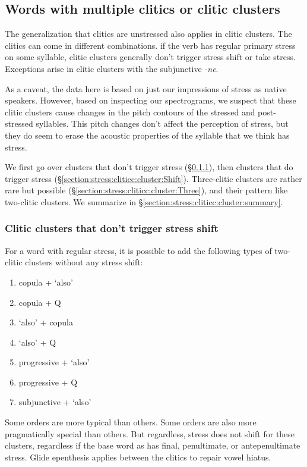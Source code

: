 \subsection{Words with multiple clitics or clitic clusters}\label{section:stress:cliticc:cluster}
The generalization that clitics are unstressed also applies in clitic clusters. The clitics can come in different combinations. if the verb has regular primary stress on some syllable, clitic clusters generally don't trigger stress shift or take stress. Exceptions arise in clitic clusters with the subjunctive \textit{-ne}.     


As a caveat, the data here is based on just our impressions of stress as native speakers. However, based on inspecting our spectrograms, we  suspect that these clitic clusters cause changes in the pitch contours of the stressed and post-stressed syllables. This pitch changes don't affect the perception of stress, but they do seem to erase the acoustic properties of the syllable that   we think has  stress. 

We first go over clusters that don't trigger stress (\S\ref{section:stress:cliticc:cluster:noShift}), then clusters that do trigger stress (\S\ref{section:stress:cliticc:cluster:Shift}). Three-clitic clusters are rather rare but possible (\S\ref{section:stress:cliticc:cluster:Three}), and their pattern like two-clitic clusters. We summarize in  \S\ref{section:stress:cliticc:cluster:summary}. 

\subsubsection{Clitic clusters that don't trigger stress shift}\label{section:stress:cliticc:cluster:noShift}
For a word with regular stress, it is possible to add the following types of two-clitic clusters without any stress shift:
\begin{enumerate}[noitemsep,topsep = 0pt]
	\item copula + `also' 
	\item copula + Q
	\item `also' + copula
	\item `also' + Q
	\item progressive + `also' 
	\item progressive + Q
	\item subjunctive + `also'
\end{enumerate}

Some orders are more typical than others. Some orders are also more pragmatically special than others. But regardless, stress does not shift for these clusters, regardless if the base word as has final, penultimate, or antepenultimate stress. Glide epenthesis applies between the clitics to repair    vowel hiatus. 


